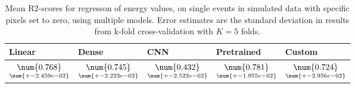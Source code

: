 \begin{table}
\centering
\caption{
Mean R2-scores for regresson of energy values, on single events in simulated data with specific pixels
set to zero, using multiple models. 
Error estimates are the standard deviation in results from k-fold cross-validation 
with $K=5$ folds.
}
\label{tab:regression-simulated-single-energy-pixelmod-r2}
\begin{tabular}{lllll}
\toprule
                                             Linear &                                               Dense &                                                 CNN &                                          Pretrained &                                              Custom \\
\midrule
 $\underset{\num{+- 2.459e-02 }  }{\num{ 0.768 } }$ &  $\underset{\num{+- 2.223e-02 }  }{\num{ 0.745 } }$ &  $\underset{\num{+- 2.522e-02 }  }{\num{ 0.432 } }$ &  $\underset{\num{+- 1.955e-02 }  }{\num{ 0.781 } }$ &  $\underset{\num{+- 2.956e-02 }  }{\num{ 0.724 } }$ \\
\bottomrule
\end{tabular}
\end{table}
